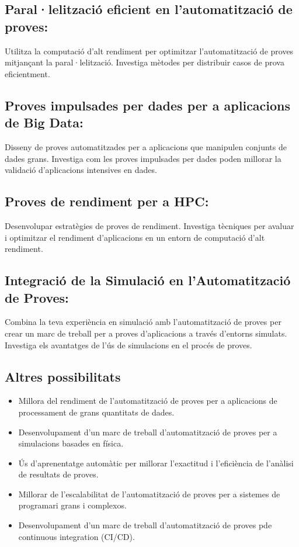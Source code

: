 \documentclass{article}
\begin{document}
\subsection{Paral·lelització eficient en l'automatització de proves:}
Utilitza la computació d'alt rendiment per optimitzar l'automatització de proves mitjançant la paral·lelització.
Investiga mètodes per distribuir casos de prova eficientment.

\subsection{Proves impulsades per dades per a aplicacions de Big Data:}
Disseny de proves automatitzades per a aplicacions que manipulen conjunts de dades grans.
Investiga com les proves impulsades per dades poden millorar la validació d'aplicacions intensives en dades.

\subsection{Proves de rendiment per a HPC:}
Desenvolupar estratègies de proves de rendiment.
Investiga tècniques per avaluar i optimitzar el rendiment d'aplicacions en un entorn de computació d'alt rendiment.

\subsection{Integració de la Simulació en l'Automatització de Proves:}
Combina la teva experiència en simulació amb l'automatització de proves per crear un marc de treball per a proves d'aplicacions a través d'entorns simulats.
Investiga els avantatges de l'ús de simulacions en el procés de proves.

\subsection{Altres possibilitats}
\begin{itemize}
\item Millora del rendiment de l'automatització de proves per a aplicacions de processament de grans quantitats de dades.
\item Desenvolupament d'un marc de treball d'automatització de proves per a simulacions basades en física.
\item Ús d'aprenentatge automàtic per millorar l'exactitud i l'eficiència de l'anàlisi de resultats de proves.
\item Millorar de l'escalabilitat de l'automatització de proves per a sistemes de programari grans i complexos.
\item Desenvolupament d'un marc de treball d'automatització de proves pde continuous integration (CI/CD).
\end{itemize}
\end{document}
